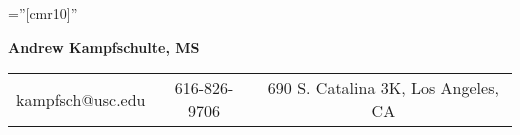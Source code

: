 \documentclass[a4paper,10pt]{article}
\begin{document}

\pagestyle{empty} %

\font\fb=''[cmr10]'' %


\par{\centering
		{\Huge \sf\bf{{Andrew Kampfschulte, MS}}
	}\par}
	
\begin{center}
\begin{tabular}{c|c|c}
kampfsch@usc.edu \hfill  & 616-826-9706 & \hfill 690 S. Catalina 3K, Los Angeles, CA
\end{tabular}
\bigskip
\end{center}



\end{document}
